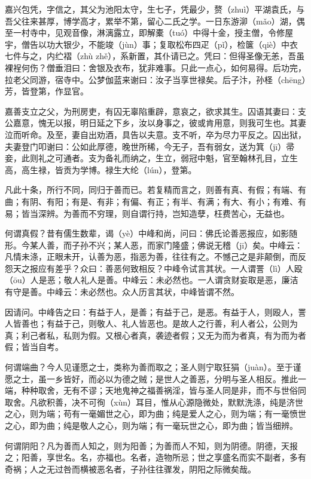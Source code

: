 \documentclass[12pt,UTF8]{ctexbook}
\begin{document}
嘉兴包凭，字信之，其父为池阳太守，生七子，凭最少，赘（zhuì）平湖袁氏，与吾父往来甚厚，博学高才，累举不第，留心二氏之学。一日东游泖（mǎo）湖，偶至一村寺中，见观音像，淋漓露立，即解橐（tuó）中得十金，授主僧，令修屋宇，僧告以功大银少，不能竣（jùn）事；复取松布四疋（pǐ），检箧（qiè）中衣七件与之，内纻褶（zhù  zhě），系新置，其仆请已之。凭曰：但得圣像无恙，吾虽裸裎何伤？僧垂泪曰：舍银及衣布，犹非难事。只此一点心，如何易得。后功完，拉老父同游，宿寺中。公梦伽蓝来谢曰：汝子当享世禄矣。后子汴，孙柽（chēng）芳，皆登第，作显官。

嘉善支立之父，为刑房吏，有囚无辜陷重辟，意哀之，欲求其生。囚语其妻曰：支公嘉意，愧无以报，明日延之下乡，汝以身事之，彼或肯用意，则我可生也。其妻泣而听命。及至，妻自出劝酒，具告以夫意。支不听，卒为尽力平反之。囚出狱，夫妻登门叩谢曰：公如此厚德，晚世所稀，今无子，吾有弱女，送为箕（jī）帚妾，此则礼之可通者。支为备礼而纳之，生立，弱冠中魁，官至翰林孔目，立生高，高生禄，皆贡为学博。禄生大纶（lún），登第。

凡此十条，所行不同，同归于善而已。若复精而言之，则善有真、有假；有端、有曲；有阴、有阳；有是、有非；有偏、有正；有半、有满；有大、有小；有难、有易；皆当深辨。为善而不穷理，则自谓行持，岂知造孽，枉费苦心，无益也。

何谓真假？昔有儒生数辈，谒（yè）中峰和尚，问曰：佛氏论善恶报应，如影随形。今某人善，而子孙不兴；某人恶，而家门隆盛；佛说无稽（jī）矣。中峰云：凡情未涤，正眼未开，认善为恶，指恶为善，往往有之。不憾己之是非颠倒，而反怨天之报应有差乎？众曰：善恶何致相反？中峰令试言其状。一人谓詈（lì）人殴（ōu）人是恶；敬人礼人是善。中峰云：未必然也。一人谓贪财妄取是恶，廉洁有守是善。中峰云：未必然也。众人历言其状，中峰皆谓不然。

因请问。中峰告之曰：有益于人，是善；有益于己，是恶。有益于人，则殴人，詈人皆善也；有益于己，则敬人、礼人皆恶也。是故人之行善，利人者公，公则为真；利己者私，私则为假。又根心者真，袭迹者假；又无为而为者真，有为而为者假；皆当自考。

何谓端曲？今人见谨愿之士，类称为善而取之；圣人则宁取狂狷（juàn）。至于谨愿之士，虽一乡皆好，而必以为德之贼；是世人之善恶，分明与圣人相反。推此一端，种种取舍，无有不谬；天地鬼神之福善祸淫，皆与圣人同是非，而不与世俗同取舍。凡欲积善，决不可徇（xùn）耳目，惟从心源隐微处，默默洗涤，纯是济世之心，则为端；苟有一毫媚世之心，即为曲；纯是爱人之心，则为端；有一毫愤世之心，即为曲；纯是敬人之心，则为端；有一毫玩世之心，即为曲；皆当细辨。

何谓阴阳？凡为善而人知之，则为阳善；为善而人不知，则为阴德。阴德，天报之；阳善，享世名。名，亦福也。名者，造物所忌；世之享盛名而实不副者，多有奇祸；人之无过咎而横被恶名者，子孙往往骤发，阴阳之际微矣哉。
\end{document}
